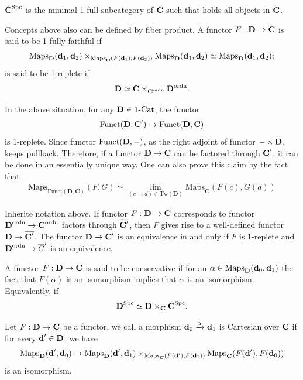 {\np $\textbf{C}^{\text{Spc}}$ is the minimal 1-full subcategory of $\textbf{C}$ such that holds all objects in $\textbf{C}$.

\np Concepts above also can be defined by fiber product. A functor $F:\textbf{D}\to\textbf{C}$ is said to be 1-fully faithful if 
\begin{align*}
    \operatorname{Maps}_{\textbf{D}}(\textbf{d}_1,\textbf{d}_2)\times_{\operatorname{Maps}_{\textbf{C}}(F(\textbf{d}_1),F(\textbf{d}_2))}\operatorname{Maps}_{\textbf{D}}(\textbf{d}_1,\textbf{d}_2)\simeq \operatorname{Maps}_{\textbf{D}}(\textbf{d}_1,\textbf{d}_2);
\end{align*}
is said to be 1-replete if 
\begin{align*}
    \textbf{D} \simeq \textbf{C}\times_{\textbf{C}^{\text{ordn}}}\textbf{D}^{\text{ordn}}.
\end{align*}


\np In the above situation, for any $\textbf{D}\in\text{1-Cat}$, the functor
\begin{align*}
    \operatorname{Funct}(\textbf{D},\textbf{C}') \to \operatorname{Funct}(\textbf{D},\textbf{C})
\end{align*}
is 1-replete. Since functor $\operatorname{Funct}(\textbf{D},-)$, as the right adjoint of functor $-\times \textbf{D}$, keeps pullback.
Therefore, if a functor $\textbf{D}\to\textbf{C}$ can be factored through $\textbf{C}'$, it can be done in an essentially unique way.
One can also prove this claim by the fact that
\begin{align*}
    \text{Maps}_{\text{Funct}(\mathbf{D}, \mathbf{C})}(F, G) \simeq \lim_{(c \to d) \in \text{Tw}(\mathbf{D})} \text{Maps}_{\mathbf{C}}(F(c), G(d))
\end{align*}

\np Inherite notation above. If functor $F:\textbf{D}\to\textbf{C}$ corresponds to functor $\textbf{D}^{\text{ordn}}\to \textbf{C}^{\text{ordn}}$ factors through $\overline{\textbf{C}'}$, then $F$ gives rise to a well-defined functor $\textbf{D}\to\overline{\textbf{C}'}$.
The functor $\textbf{D}\to \textbf{C}'$ is an equivalence in and only if $F$ is 1-replete and $\textbf{D}^{\text{ordn}}\to \overline{C}'$ is an equivalence.

\np A functor $F:\textbf{D}\to\textbf{C}$ is said to be conservative if for an $\alpha\in\operatorname{Maps}_{\textbf{D}}(\textbf{d}_0,\textbf{d}_1)$ the fact that $F(\alpha)$ is an isomorphism implies that $\alpha$ is an isomorphism.
Equivalently, if 
\begin{align*}
   \textbf{D}^{\text{Spc}} \simeq \textbf{D}\times_{\textbf{C}}\textbf{C}^{\text{Spc}}.
\end{align*}

\np Let $F:\textbf{D}\to\textbf{C}$ be a functor. we call a morphism $\textbf{d}_0\xrightarrow{\alpha}\textbf{d}_1$ is Cartesian over $\textbf{C}$ if for every $\textbf{d}'\in\textbf{D}$, we have 
\begin{align*}
    \operatorname{Maps}_{\textbf{D}}(\textbf{d}',\textbf{d}_0)\to \operatorname{Maps}_{\textbf{D}}(\textbf{d}',\textbf{d}_1)\times_{\operatorname{Maps}_{\textbf{C}}(F(\textbf{d}'),F(\textbf{d}_1))} \operatorname{Maps}_{\textbf{C}}(F(\textbf{d}'),F(\textbf{d}_0))
\end{align*}
is an isomorphism. 

}
